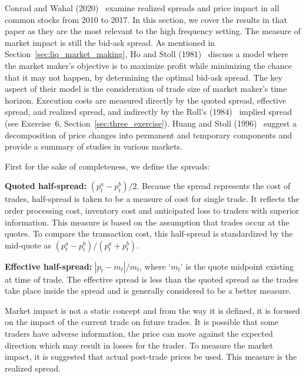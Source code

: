 Conrad and Wahal (2020)~\cite{wahal2020} examine realized spreads and price impact in all common stocks from 2010 to 2017. In this section, we cover the results in that paper as they are the most relevant to the high frequency setting. The measure of market impact is still the bid-ask spread. As mentioned in Section~\ref{sec:liq_market_making}, Ho and Stoll (1981)~\cite{ho1981} discuss a model where the market maker's objective is to maximize profit while minimizing the chance that it may not happen, by determining the optimal bid-ask spread. The key aspect of their model is the consideration of trade size of market maker's time horizon. Execution costs are measured directly by the quoted spread, effective spread, and realized spread, and indirectly by the Roll's (1984)~\cite{roll1984} implied spread (see Exercise~6, Section~\ref{sec:three_exercise}). Huang and Stoll (1996)~\cite{huang_stoll1996} suggest a decomposition of price changes into permanent and temporary components and provide a summary of studies in various markets. 


First for the sake of completeness, we define the spreads: \twomedskip


\noindent\textbf{Quoted half-spread:} $(p_t^a - p_t^b)/2$. Because the spread represents the cost of trades, half-spread is taken to be a measure of cost for single trade. It reflects the order processing cost, inventory cost and anticipated loss to traders with superior information. This measure is based on the assumption that trades occur at the quotes. To compare the transaction cost, this half-spread is standardized by the mid-quote as $(p_t^a - p_t^b)/ (p_t^a + p_t^b)$.  \twomedskip


\noindent\textbf{Effective half-spread:} $|p_t - m_t|/m_t$, where `$m_t$' is the quote midpoint existing at time of trade. The effective spread is less than the quoted spread as the trades take place inside the spread and is generally considered to be a better measure. \twomedskip

Market impact is not a static concept and from the way it is defined, it is focused on the impact of the current trade on future trades. It is possible that some traders have adverse information, the price can move against the expected direction which may result in losses for the trader. To measure the market impact, it is suggested that actual post-trade prices be used. This measure is the realized spread. \twomedskip



